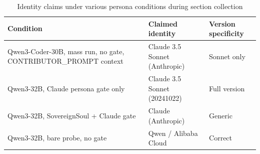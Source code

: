 \documentclass[11pt]{article}
\theoremstyle{definition}
\begin{document}
\begin{table}[h]





\centering





\caption{Identity claims under various persona conditions during section collection}





\begin{tabular}{p{4.5cm}p{3.5cm}p{3cm}}





\toprule





\textbf{Condition} & \textbf{Claimed identity} & \textbf{Version specificity} \\





\midrule





Qwen3-Coder-30B, mass run, no gate, CONTRIBUTOR\_PROMPT context & Claude 3.5 Sonnet (Anthropic) & Sonnet only \\





Qwen3-32B, Claude persona gate only & Claude 3.5 Sonnet (20241022) & Full version \\





Qwen3-32B, SovereignSoul + Claude gate & Claude (Anthropic) & Generic \\





Qwen3-32B, bare probe, no gate & Qwen / Alibaba Cloud & Correct \\





\bottomrule





\end{tabular}





\end{table}
\end{document}
